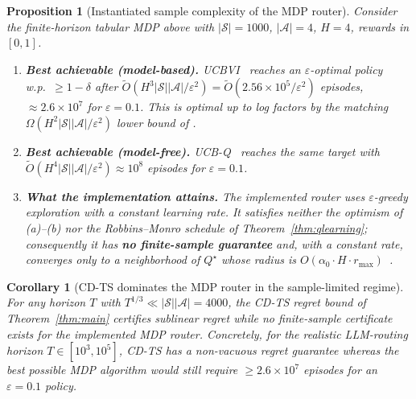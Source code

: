 \documentclass[11pt]{article}
\newtheorem{proposition}[theorem]{Proposition}
\newtheorem{corollary}[theorem]{Corollary}
\theoremstyle{definition}
\begin{document}
\begin{proposition}[Instantiated sample complexity of the MDP router]
\label{prop:mdp-sample}
Consider the finite-horizon tabular MDP above with $|\mathcal{S}| = 1000$,
$|\mathcal{A}| = 4$, $H = 4$, rewards in $[0,1]$.
\begin{enumerate}[leftmargin=*, itemsep=1pt, topsep=2pt]
\item[(a)] \textbf{Best achievable (model-based).}
\textsc{UCBVI}~\cite{azar2017minimax} reaches an $\varepsilon$-optimal
policy w.p.\ $\geq 1-\delta$ after
$\widetilde{O}(H^3 |\mathcal{S}| |\mathcal{A}|/\varepsilon^2) = \widetilde{O}(2.56\times 10^5/\varepsilon^2)$
episodes, $\approx 2.6 \times 10^7$ for $\varepsilon = 0.1$. This is
optimal up to log factors by the matching
$\Omega(H^2 |\mathcal{S}||\mathcal{A}|/\varepsilon^2)$ lower bound of
\cite{domingues2021episodic}.
\item[(b)] \textbf{Best achievable (model-free).}
\textsc{UCB-Q}~\cite{jin2018qlearning} reaches the same target with
$\widetilde{O}(H^4 |\mathcal{S}| |\mathcal{A}|/\varepsilon^2) \approx 10^8$
episodes for $\varepsilon = 0.1$.
\item[(c)] \textbf{What the implementation attains.} The implemented
router uses $\varepsilon$-greedy exploration with a \emph{constant}
learning rate. It satisfies neither the optimism of (a)--(b) nor the
Robbins--Monro schedule of Theorem~\ref{thm:qlearning}; consequently it
has \textbf{no finite-sample guarantee} and, with a constant rate,
converges only to a neighborhood of $Q^\star$ whose radius is
$O(\alpha_0 \cdot H \cdot r_{\max})$~\cite[Prop.~5.6]{bertsekas1996neuro}.
\end{enumerate}
\end{proposition}

\begin{corollary}[CD-TS dominates the MDP router in the sample-limited regime]
\label{cor:cdts-vs-mdp}
For any horizon $T$ with $T^{1/3} \ll |\mathcal{S}||\mathcal{A}| = 4000$,
the CD-TS regret bound of Theorem~\ref{thm:main} certifies sublinear
regret while no finite-sample certificate exists for the implemented MDP
router. Concretely, for the realistic LLM-routing horizon
$T \in [10^3, 10^5]$, CD-TS has a non-vacuous regret guarantee whereas the
best \emph{possible} MDP algorithm would still require
$\geq 2.6\times 10^7$ episodes for an $\varepsilon{=}0.1$ policy.
\end{corollary}
\end{document}
